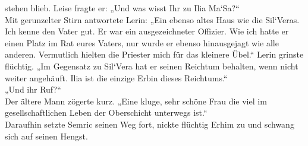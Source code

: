 stehen blieb. Leise fragte er: „Und was wisst Ihr zu Ilia Ma‘Sa?“\\
Mit gerunzelter Stirn antwortete Lerin: „Ein ebenso altes Haus wie die Sil‘Veras. Ich kenne den 
Vater gut. Er war ein ausgezeichneter Offizier. Wie ich hatte er einen Platz im Rat eures Vaters, 
nur wurde er ebenso hinausgejagt wie alle anderen. Vermutlich hielten die Priester mich für das 
kleinere Übel.“ Lerin grinste flüchtig. „Im Gegensatz zu Sil‘Vera hat er seinen Reichtum behalten, 
wenn nicht weiter angehäuft. Ilia ist die einzige Erbin dieses Reichtums.“\\
„Und ihr Ruf?“\\
Der ältere Mann zögerte kurz. „Eine kluge, sehr schöne Frau die viel im gesellschaftlichen Leben der 
Oberschicht unterwegs ist.“\\
Daraufhin setzte Semric seinen Weg fort, nickte flüchtig Erhim zu und schwang sich auf seinen 
Hengst.\\


